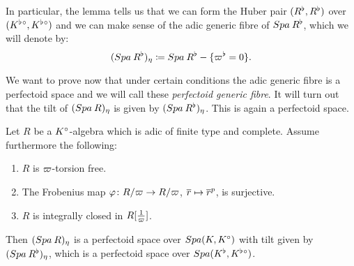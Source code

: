 In particular, the lemma tells us that we can form the Huber pair $(R^{\flat},R^{\flat})$ over $(K^{\flat}{^{\circ}},K^{\flat}{^{\circ}})$ and we can make sense of the
adic generic fibre of ${Spa{\:R^{\flat}}}$, which we will denote by:
\[({Spa{\:R^{\flat}}})_{\eta}\coloneqq {Spa{\:R^{\flat}}}-\{\varpi^{\flat}=0\}.\]

We want to prove now that under certain conditions the adic generic fibre is a perfectoid space and we will call these \emph{perfectoid generic fibre}. 
It will turn out that the tilt of $({Spa{\:R}})_{\eta}$ is given by $({Spa{\:R^{\flat}}})_{\eta}$.
This is again a perfectoid space.


\begin{theorem}\label{pfibrethm}
Let $R$ be a $K{^{\circ}}$-algebra which is adic of finite type and complete.
Assume  furthermore the following:
\begin{enumerate}
\item $R$ is $\varpi$-torsion free.
\item The Frobenius map $\varphi\colon R/\varpi \to R/\varpi$, $\overline{r}\mapsto \overline{r}^p$, is surjective.
\item $R$ is integrally closed in $R[\tfrac{1}{\varpi}]$.
\end{enumerate}
Then $({Spa{\:R}})_{\eta}$ is a perfectoid space over ${Spa({K},{K{^{\circ}}})}$ with tilt given by $({Spa{\:R^{\flat}}})_{\eta}$, which is a perfectoid space over ${Spa({K^{\flat}},{K^{\flat}{^{\circ}}})}$.
\end{theorem}
